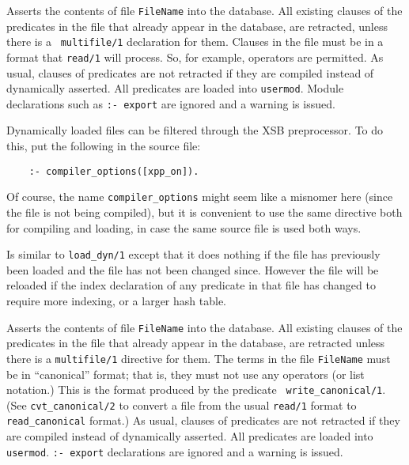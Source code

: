 \begin{description}
\label{load_dyn/1}
    Asserts the contents of file {\tt FileName} into the database.
    All existing clauses of the predicates in the file that already
    appear in the database, are retracted, unless there is a {\tt
    multifile/1} declaration for them.  Clauses in the file must be
    in a format that {\tt read/1} will process.  So, for example,
    operators are permitted.  As usual, clauses of predicates are not
    retracted if they are compiled instead of dynamically asserted.
    All predicates are loaded into {\tt usermod}.  Module declarations
    such as {\tt :- export} are ignored and a warning is issued.

    Dynamically loaded files can be filtered through the XSB preprocessor.
    To do this, put the following in the source file: 
    \begin{verbatim}
    :- compiler_options([xpp_on]).      
    \end{verbatim}
    Of course, the name \verb|compiler_options| might seem like a misnomer
    here (since the file is not being compiled), but it is convenient to
    use the same directive both for compiling and loading, in case the same
    source file is used both ways.

    Is similar to {\tt load\_dyn/1} except that it does nothing if the
    file has previously been loaded and the file has not been changed
    since.  However the file will be reloaded if the index declaration of
    any predicate in that file has changed to require more indexing, or a
    larger hash table.

    Asserts the contents of file {\tt FileName} into the database.
    All existing clauses of the predicates in the file that already appear
    in the database, are retracted unless there is a {\tt multifile/1}
    directive for them.  The terms in the file {\tt FileName} must be in
    ``canonical'' format; that is, they must not use any operators (or
    list notation.) This is the format produced by the predicate {\tt
    write\_canonical/1}. (See {\tt cvt\_canonical/2} to convert a file from
    the usual {\tt read/1} format to {\tt read\_canonical} format.)  As
    usual, clauses of predicates are not retracted if they are compiled
    instead of dynamically asserted. All predicates are loaded into {\tt
    usermod}.  {\tt :- export} declarations are ignored and a warning is
    issued.


\end{description}
